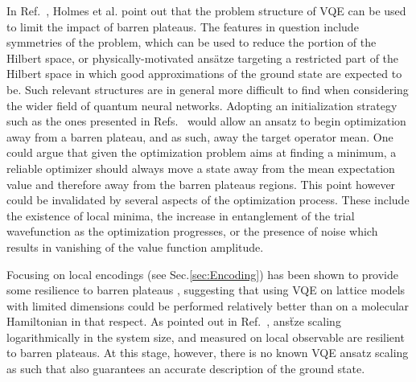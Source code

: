 In Ref.~\cite{Holmes2021}, Holmes et al. point out that the problem structure of VQE can be used to limit the impact of barren plateaus. The features in question include symmetries of the problem, which can be used to reduce the portion of the Hilbert space, or physically-motivated ans\"atze targeting a restricted part of the Hilbert space in which good approximations of the ground state are expected to be. Such relevant structures are in general more difficult to find when considering the wider field of quantum neural networks. 
Adopting an initialization strategy such as the ones presented in Refs.~\cite{Grant2019, Sauvage2021, Patti2021} would allow an ansatz to begin optimization away from a barren plateau, and as such, away the target operator mean. One could argue that given the optimization problem aims at finding a minimum, a reliable optimizer should always move a state away from the mean expectation value and therefore away from the barren plateaus regions. This point however could be invalidated by several aspects of the optimization process. These include the existence of local minima, the increase in entanglement of the trial wavefunction as the optimization progresses, or the presence of noise which results in vanishing of the value function amplitude. 

Focusing on local encodings (see Sec.\ref{sec:Encoding}) has been shown to provide some resilience to barren plateaus \cite{Cerezo2021_BP, Uvarov2020, Uvarov2020_frustrated}, suggesting that using VQE on lattice models with limited dimensions could be performed relatively better than on a molecular Hamiltonian in that respect. As pointed out in Ref.~\cite{Cerezo2021_BP}, ans\"tze scaling logarithmically in the system size, and measured on local observable are resilient to barren plateaus. At this stage, however, there is no known VQE ansatz scaling as such that also guarantees an accurate description of the ground state. 

